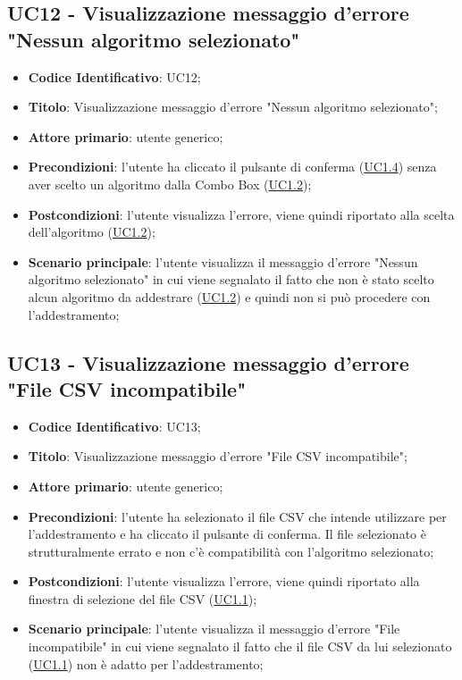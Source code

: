 		
	\label{par:UC12}
	\subsection{UC12 - Visualizzazione messaggio d'errore "Nessun algoritmo selezionato"}
		\begin{itemize}
			\item\textbf{Codice Identificativo}: UC12;
			\item\textbf{Titolo}: Visualizzazione messaggio d'errore "Nessun algoritmo selezionato";
			\item\textbf{Attore primario}: utente generico;
			\item\textbf{Precondizioni}: l'utente ha cliccato il pulsante di conferma (\hyperref[par:UC1.4]{UC1.4}) senza aver scelto un algoritmo dalla Combo Box (\hyperref[par:UC1.2]{UC1.2});
			\item\textbf{Postcondizioni}: l'utente visualizza l'errore, viene quindi riportato alla scelta dell'algoritmo (\hyperref[par:UC1.2]{UC1.2});
			\item\textbf{Scenario principale}: l'utente visualizza il messaggio d'errore "Nessun algoritmo selezionato" in cui viene segnalato il fatto che non è stato scelto alcun algoritmo da addestrare (\hyperref[par:UC1.2]{UC1.2}) e quindi non si può procedere con l'addestramento; 		
		\end{itemize}
		
		
	\label{par:UC13}
	\subsection{UC13 - Visualizzazione messaggio d'errore "File CSV incompatibile"}
		\begin{itemize}
			\item\textbf{Codice Identificativo}: UC13;
			\item\textbf{Titolo}: Visualizzazione messaggio d'errore "File CSV incompatibile";
			\item\textbf{Attore primario}: utente generico;
			\item\textbf{Precondizioni}: l'utente ha selezionato il file CSV che intende utilizzare per l'addestramento e ha cliccato il pulsante di conferma. Il file selezionato è strutturalmente errato e non c'è compatibilità con l'algoritmo selezionato;
			\item\textbf{Postcondizioni}: l'utente visualizza l'errore, viene quindi riportato alla finestra di selezione del file CSV (\hyperref[par:UC1.1]{UC1.1});
			\item\textbf{Scenario principale}: l'utente visualizza il messaggio d'errore "File incompatibile" in cui viene segnalato il fatto che il file CSV da lui selezionato (\hyperref[par:UC1.1]{UC1.1}) non è adatto per l'addestramento; 		
		\end{itemize}

